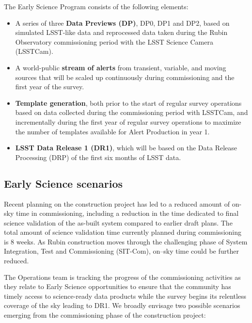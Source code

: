 The Early Science Program consists of the following elements:
\begin{itemize}
	\item A series of three \textbf{Data Previews (DP)}, DP0, DP1 and DP2,  based on simulated LSST-like data and reprocessed data taken during the Rubin Observatory commissioning period with the LSST Science Camera (LSSTCam). 
	\item A world-public \textbf{stream of alerts} from transient, variable, and moving sources that will be scaled up continuously during commissioning and the first year of the survey. 
	\item  \textbf{Template generation}, both prior to the start of regular survey operations based on data collected during the commissioning period with LSSTCam, and incrementally during the first year of regular survey operations  to maximize the number of templates available for Alert Production in year 1. 
	\item \textbf{LSST Data Release 1 (DR1)}, which will be based on the Data Release Processing (DRP) of the first six months of LSST data.
\end{itemize}


\subsection{Early Science scenarios } \label{ssec:scenarios}

Recent planning on the construction project has led to a reduced amount of on-sky time in commissioning, including a reduction in the time dedicated to final science validation of the as-built system compared to earlier draft plans.
The total amount of science validation time currently planned during commissioning is 8 weeks.
As Rubin construction moves through the challenging phase of System Integration, Test and Commissioning (SIT-Com), on--sky time could be further reduced.

The Operations team is tracking the progress of the commissioning activities as they relate to Early Science opportunities to ensure that the community has timely access to science-ready data products while the survey begins its relentless coverage of the sky leading to DR1.
We broadly envisage two possible scenarios emerging from the commissioning phase of the construction project: 

